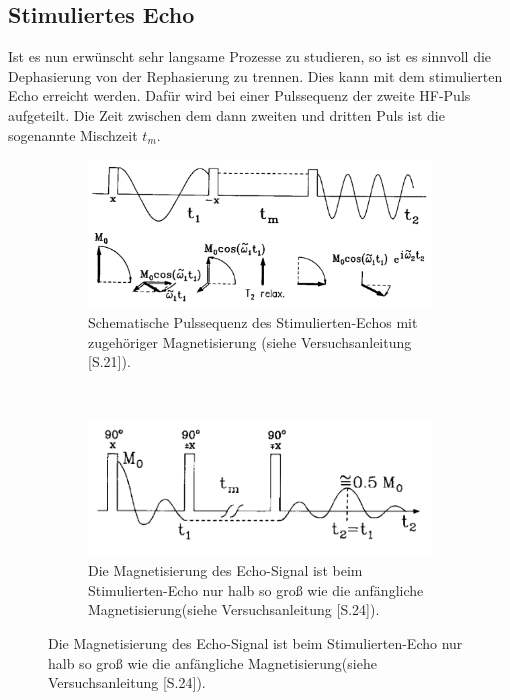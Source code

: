 \subsection{Stimuliertes Echo}
Ist es nun erw\"{u}nscht sehr langsame Prozesse zu studieren, so ist es sinnvoll die Dephasie{\-}rung von der Rephasierung zu trennen.
Dies kann mit dem stimulierten Echo erreicht werden.
Daf\"{u}r wird bei einer Pulssequenz der zweite HF-Puls aufgeteilt.
Die Zeit zwischen dem dann zweiten und dritten Puls ist die sogenannte Mischzeit $t_m$.
\begin{figure}
\centering
\caption{Stimuliertes-Echo.}
\vspace{+5pt}
	\begin{subfigure}[t]{0.4\textwidth}
		\includegraphics[width=\textwidth]{Plots/stimuliertesecho.png} 
		\caption{Schematische Pulssequenz des Stimulierten-Echos mit zugeh\"{o}riger Magnetisierung (siehe Versuchsanleitung \cite{Anleitung}[S.21]).}
	\end{subfigure}
	~
	\begin{subfigure}[t]{0.4\textwidth}
		\includegraphics[width=\textwidth]{Plots/stimuliertesecho2.png}
		\caption{Die Magnetisierung des Echo-Signal ist beim Stimulierten-Echo nur halb so gro{\ss} wie die anf\"{a}ngliche Magnetisierung(siehe Versuchsanleitung \cite{Anleitung}[S.24]).}
	\end{subfigure}
\label{stimEcho.}
\end{figure}
